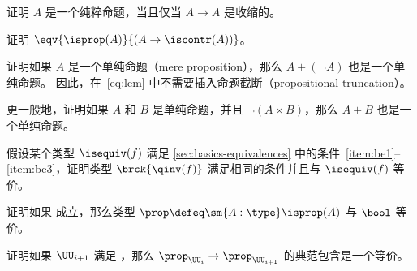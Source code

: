 \begin{ex}\label{ex:prop-endocontr}
证明 $A$ 是一个纯粹命题，当且仅当 $A\to A$ 是收缩的。
\end{ex}

\begin{ex}\label{ex:prop-inhabcontr}
证明 $\eqv{\isprop(A)}{(A\to\iscontr(A))}$。
\end{ex}

\begin{ex}\label{ex:lem-mereprop}
证明如果 $A$ 是一个单纯命题（mere proposition），那么 $A+(\neg A)$ 也是一个单纯命题。
因此，在~\eqref{eq:lem} 中不需要插入命题截断（propositional truncation）。
\end{ex}

\begin{ex}\label{ex:disjoint-or}
更一般地，证明如果 $A$ 和 $B$ 是单纯命题，并且 $\neg(A\times B)$，那么 $A+B$ 也是一个单纯命题。
\end{ex}




\begin{ex}\label{ex:brck-qinv}
假设某个类型 $\isequiv(f)$ 满足 \cref{sec:basics-equivalences} 中的条件~\ref{item:be1}--\ref{item:be3}，证明类型 $\brck{\qinv(f)}$ 满足相同的条件并且与 $\isequiv(f)$ 等价。
\end{ex}

\begin{ex}\label{ex:lem-impl-prop-equiv-bool}
证明如果 \LEM{} 成立，那么类型 $\prop \defeq \sm{A:\type} \isprop(A)$ 与 $\bool$ 等价。
\end{ex}

\begin{ex}\label{ex:lem-impred}
证明如果 $\UU_{i+1}$ 满足 \LEM{}，那么 $\prop_{\UU_i} \to \prop_{\UU_{i+1}}$ 的典范包含是一个等价。
\end{ex}

